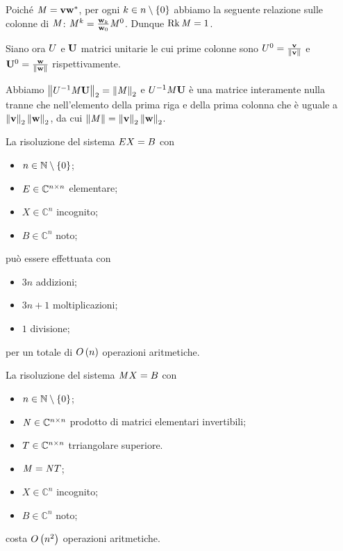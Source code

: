 \Proof Poich\'e
$\mathit{M} = \mathbf{v}{\mathbf{w}}^*$,
per ogni $k \in n \setminus \lbrace 0 \rbrace$ abbiamo la seguente relazione sulle colonne di
$\mathit{M}$:
$\mathit{M}^k = \frac{\mathbf{w}_k}{\mathbf{w}_0} \mathit{M}^0$.
Dunque $\operatorname{Rk}{\mathit{M}} = 1$.
\par Siano ora $U$ e $\mathbf{U}$ matrici unitarie le cui
prime colonne sono
$\UnitaryMatrix^0 = \frac{\Vector}{\Norm{\Vector}}$
e
$\VarUnitaryMatrix^0 = \frac{\VarVector}{\Norm{\VarVector}}$
rispettivamente.
\par Abbiamo
$\Norm{\UnitaryMatrix^{-1}\Matrix\VarUnitaryMatrix}[2]
= \Norm{\Matrix}[2]$
e
$U^{-1}\mathit{M}\mathbf{U}$ \`e una matrice interamente
nulla tranne che nell'elemento della prima riga e della prima colonna
che \`e uguale a
$\Norm{\Vector}[2] \Norm{\VarVector}[2]$,
da cui
$\Norm{\Matrix} =
\Norm{\Vector}[2] \Norm{\VarVector}[2]$. \EndProof
\begin{Theorem}
  La risoluzione del sistema
  $E X = B$ con
  \begin{itemize}
    \item $n \in \mathbb{N} \setminus \lbrace 0 \rbrace$;
    \item $E \in \mathbb{C}^{n \times n}$ elementare;
    \item $X \in \mathbb{C}^n$ incognito;
    \item $B \in \mathbb{C}^n$ noto;
  \end{itemize}
  pu\`o essere effettuata con
  \begin{itemize}
    \item $3n$ addizioni;
    \item $3n + 1$ moltiplicazioni;
    \item $1$ divisione;
  \end{itemize}
  per un totale di $O \left ( n \right )$ operazioni aritmetiche.
\end{Theorem}
\begin{Corollary}
  La risoluzione del sistema
  $\mathit{M} X = B$ con
  \begin{itemize}
    \item $n \in \mathbb{N} \setminus \lbrace 0 \rbrace$;
    \item $\mathit{N} \in \mathbb{C}^{n \times n}$ prodotto di matrici
      elementari invertibili;
    \item $T \in \mathbb{C}^{n \times n}$ trriangolare
      superiore.
    \item $\mathit{M} = \mathit{N}T$;
    \item $X \in \mathbb{C}^n$ incognito;
    \item $B \in \mathbb{C}^n$ noto;
  \end{itemize}
  costa $O \left ( n^2 \right )$ operazioni aritmetiche.
\end{Corollary}
